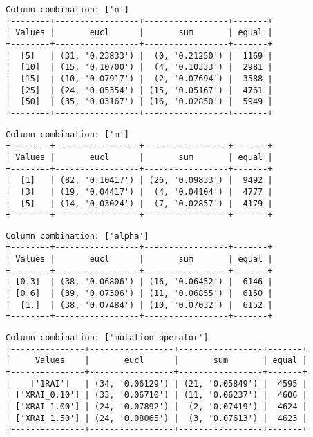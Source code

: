 \documentclass{article}
\begin{document}
\begin{verbatim}
Column combination: ['n']
+--------+-----------------+-----------------+-------+
| Values |       eucl      |       sum       | equal |
+--------+-----------------+-----------------+-------+
|  [5]   | (31, '0.23833') |  (0, '0.21250') |  1169 |
|  [10]  | (15, '0.10700') |  (4, '0.10333') |  2981 |
|  [15]  | (10, '0.07917') |  (2, '0.07694') |  3588 |
|  [25]  | (24, '0.05354') | (15, '0.05167') |  4761 |
|  [50]  | (35, '0.03167') | (16, '0.02850') |  5949 |
+--------+-----------------+-----------------+-------+
\end{verbatim}

\begin{verbatim}
Column combination: ['m']
+--------+-----------------+-----------------+-------+
| Values |       eucl      |       sum       | equal |
+--------+-----------------+-----------------+-------+
|  [1]   | (82, '0.10417') | (26, '0.09833') |  9492 |
|  [3]   | (19, '0.04417') |  (4, '0.04104') |  4777 |
|  [5]   | (14, '0.03024') |  (7, '0.02857') |  4179 |
+--------+-----------------+-----------------+-------+
\end{verbatim}

\begin{verbatim}
Column combination: ['alpha']
+--------+-----------------+-----------------+-------+
| Values |       eucl      |       sum       | equal |
+--------+-----------------+-----------------+-------+
| [0.3]  | (38, '0.06806') | (16, '0.06452') |  6146 |
| [0.6]  | (39, '0.07306') | (11, '0.06855') |  6150 |
|  [1.]  | (38, '0.07484') | (10, '0.07032') |  6152 |
+--------+-----------------+-----------------+-------+
\end{verbatim}

\begin{verbatim}
Column combination: ['mutation_operator']
+---------------+-----------------+-----------------+-------+
|     Values    |       eucl      |       sum       | equal |
+---------------+-----------------+-----------------+-------+
|    ['1RAI']   | (34, '0.06129') | (21, '0.05849') |  4595 |
| ['XRAI_0.10'] | (33, '0.06710') | (11, '0.06237') |  4606 |
| ['XRAI_1.00'] | (24, '0.07892') |  (2, '0.07419') |  4624 |
| ['XRAI_1.50'] | (24, '0.08065') |  (3, '0.07613') |  4623 |
+---------------+-----------------+-----------------+-------+
\end{verbatim}
\end{document}
